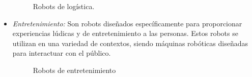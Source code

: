 \begin{itemize}
 \pagebreak
 
 \begin{figure}[h!]
    \begin{center}
      \subcapcentertrue
      \hspace{2mm}
    \end{center}
    \caption{Robots de logística.}
    \label{fig:Robots de logística}
  \end{figure}
  
 \item \textit{Entretenimiento:} Son robots diseñados específicamente para proporcionar experiencias lúdicas y de entretenimiento a las personas. Estos robots se utilizan en una variedad de contextos, siendo máquinas robóticas diseñadas para interactuar con el público. 
 
  \begin{figure}[h!]
    \begin{center}
      \subcapcentertrue
      \hspace{2mm}
    \end{center}
    \caption{Robots de entretenimiento}
    \label{fig:Robots_entretenimiento}
  \end{figure}
   
\end{itemize}

